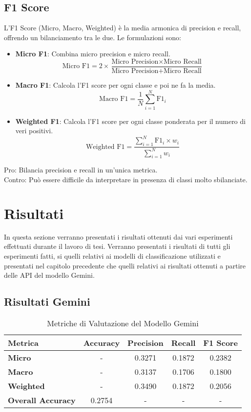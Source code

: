 \documentclass[../../Thesis.tex]{subfiles}
\begin{document}
\subsection*{F1 Score}
L'F1 Score (Micro, Macro, Weighted) è la media armonica di precision e recall, offrendo un bilanciamento tra le due. Le formulazioni sono:
\begin{itemize}
    \item \textbf{Micro F1}: Combina micro precision e micro recall.
    $$ \text{Micro F1} = 2 \times \frac{\text{Micro Precision} \times \text{Micro Recall}}{\text{Micro Precision} + \text{Micro Recall}} $$
    \item \textbf{Macro F1}: Calcola l'F1 score per ogni classe e poi ne fa la media.
    $$ \text{Macro F1} = \frac{1}{N} \sum_{i=1}^{N} \text{F1}_i $$
    \item \textbf{Weighted F1}: Calcola l'F1 score per ogni classe ponderata per il numero di veri positivi.
    $$ \text{Weighted F1} = \frac{\sum_{i=1}^{N} \text{F1}_i \times w_i}{\sum_{i=1}^{N} w_i} $$
\end{itemize}
Pro: Bilancia precision e recall in un'unica metrica.\\
Contro: Può essere difficile da interpretare in presenza di classi molto sbilanciate.

\section{Risultati}
In questa sezione verranno presentati i risultati ottenuti dai vari esperimenti effettuati durante il lavoro di tesi. Verranno presentati i risultati di tutti gli esperimenti fatti, si quelli relativi ai modelli di classificazione utilizzati e presentati nel capitolo precedente che quelli relativi ai risultati ottenuti a partire delle API del modello Gemini. 

\subsection{Risultati Gemini}

\begin{table}[h!]
    \centering
    \begin{tabular}{|l|c|c|c|c|}
        \hline
        \textbf{Metrica} & \textbf{Accuracy} & \textbf{Precision} & \textbf{Recall} & \textbf{F1 Score} \\
        \hline
        \textbf{Micro} & - & 0.3271 & 0.1872 & 0.2382 \\
        \textbf{Macro} & - & 0.3137 & 0.1706 & 0.1800 \\
        \textbf{Weighted} & - & 0.3490 & 0.1872 & 0.2056 \\
        \hline
        \textbf{Overall Accuracy} & 0.2754 & - & - & - \\
        \hline
    \end{tabular}
    \caption{Metriche di Valutazione del Modello Gemini}
\end{table}
\end{document}
